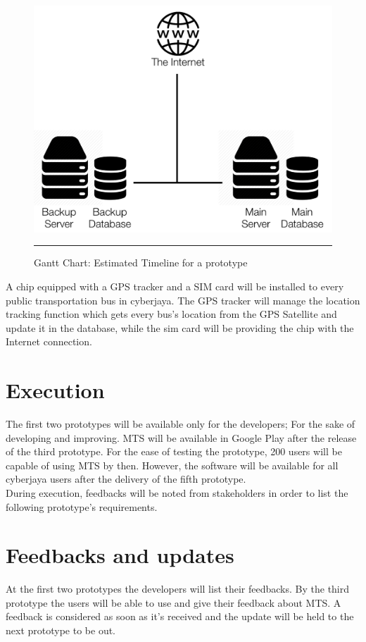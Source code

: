 \begin{figure}[H]
	\centering
	\includegraphics[scale=0.55]{Figures/FigureInstallation.png}
	\rule{35em}{0.5pt}
	\caption[Gantt Chart: Estimated Timeline for a prototype]{Gantt Chart: Estimated Timeline for a prototype}
	\label{fig:ServerArch}
\end{figure}

A chip equipped with a GPS tracker and a SIM card will be installed to every public transportation bus in cyberjaya. The GPS tracker will manage the location tracking function which gets every bus’s location from the GPS  Satellite and update it in the database, while the sim card will be providing the chip with the Internet connection.\\

\section{Execution}
The first two prototypes will be available only for the developers; For the sake of developing and improving. MTS will be available in Google Play after the release of the third prototype. For the ease of testing the prototype, 200 users will be capable of using MTS by then. However, the software will be available for all cyberjaya users after the delivery of the fifth prototype.\\

During execution, feedbacks will be noted from stakeholders in order to list the following prototype’s requirements.


\section{Feedbacks and updates}
At the first two prototypes the developers will list their feedbacks. By the third prototype the users will be able to use and give their feedback about MTS. A feedback is considered as soon as it’s received and the update will be held to the next prototype to be out.



\pagebreak

